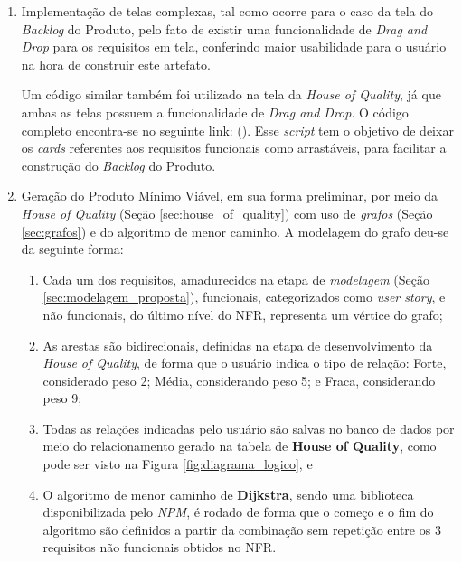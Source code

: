 \begin{enumerate}
    \item Implementação de telas complexas, tal como ocorre para o caso da tela do \textit{Backlog} do Produto, pelo fato de existir uma funcionalidade de \textit{Drag and Drop} para os requisitos em tela, conferindo maior usabilidade para o usuário na hora de construir este artefato.

    \label{codigo:backlog}
    
    
        
    Um código similar também foi utilizado na tela da \textit{House of Quality}, já que ambas as telas possuem a funcionalidade de \textit{Drag and Drop}. O código completo encontra-se no seguinte link:  (\citeyear{tela_backlog_iflow}). Esse \textit{script} tem o objetivo de deixar os \textit{cards} referentes aos requisitos funcionais como arrastáveis, para facilitar a construção do \textit{Backlog} do Produto.
    
    \item Geração do Produto Mínimo Viável, em sua forma preliminar, por meio da  \textit{House of Quality} (Seção \ref{sec:house_of_quality}) com uso de \textit{grafos} (Seção \ref{sec:grafos}) e do algoritmo de menor caminho. A modelagem do grafo deu-se da seguinte forma:
    
    \begin{enumerate}
        \item Cada um dos requisitos, amadurecidos na etapa de \textit{modelagem} (Seção \ref{sec:modelagem_proposta}), funcionais, categorizados como \textit{user story}, e não funcionais, do último nível do NFR, representa um vértice do grafo;
        \item As arestas são bidirecionais, definidas na etapa de desenvolvimento da \textit{House of Quality}, de forma que o usuário indica o tipo de relação: Forte, considerado peso 2; Média, considerando peso 5; e Fraca, considerando peso 9;
        \item Todas as relações indicadas pelo usuário são salvas no banco de dados por meio do relacionamento gerado na tabela de \textbf{House of Quality}, como pode ser visto na Figura \ref{fig:diagrama_logico}, e
        \item O algoritmo de menor caminho de \textbf{Dijkstra}, sendo uma biblioteca disponibilizada pelo \textit{NPM}, é rodado de forma que o começo e o fim do algoritmo são definidos a partir da combinação sem repetição entre os 3 requisitos não funcionais obtidos no NFR.
    \end{enumerate}
    

\end{enumerate}
